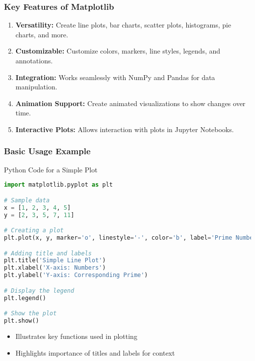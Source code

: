 \documentclass{beamer}
\begin{document}
\begin{frame}
    \frametitle{Key Features of Matplotlib}
    \begin{enumerate}
        \item \textbf{Versatility:} Create line plots, bar charts, scatter plots, histograms, pie charts, and more.
        \item \textbf{Customizable:} Customize colors, markers, line styles, legends, and annotations.
        \item \textbf{Integration:} Works seamlessly with NumPy and Pandas for data manipulation.
        \item \textbf{Animation Support:} Create animated visualizations to show changes over time.
        \item \textbf{Interactive Plots:} Allows interaction with plots in Jupyter Notebooks.
    \end{enumerate}
\end{frame}

\begin{frame}[fragile]
    \frametitle{Basic Usage Example}
    \begin{block}{Python Code for a Simple Plot}
        \begin{lstlisting}[language=Python]
import matplotlib.pyplot as plt

# Sample data
x = [1, 2, 3, 4, 5]
y = [2, 3, 5, 7, 11]

# Creating a plot
plt.plot(x, y, marker='o', linestyle='-', color='b', label='Prime Numbers')

# Adding title and labels
plt.title('Simple Line Plot')
plt.xlabel('X-axis: Numbers')
plt.ylabel('Y-axis: Corresponding Prime')

# Display the legend
plt.legend()

# Show the plot
plt.show()
        \end{lstlisting}
    \end{block}
    \begin{itemize}
        \item Illustrates key functions used in plotting
        \item Highlights importance of titles and labels for context
    \end{itemize}
\end{frame}
\end{document}
